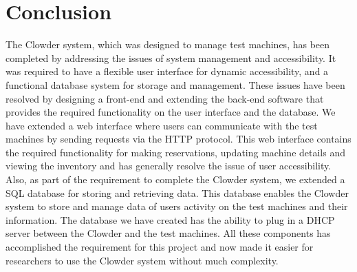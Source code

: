 \chapter{Conclusion}
\label{chap:conclusions}

The Clowder system, which was designed to manage test machines, has been completed by addressing the issues of system management and accessibility. It was required to have a flexible user interface for dynamic accessibility, and a functional database system for storage and management. These issues have been resolved by designing a front-end and extending the back-end  software that provides the required functionality on the user interface and the database. We have extended a web interface where users can communicate with the test machines by sending requests via the HTTP protocol. This web interface contains the required functionality for making reservations, updating machine details and viewing the inventory and has generally resolve the issue of user accessibility. Also, as part of the requirement to complete the Clowder system, we extended a SQL database for storing and retrieving data. This database enables the Clowder system to store and manage data of users  activity on the test machines and their information. The database we have created has the ability to plug in a DHCP server between the Clowder and the test machines. All these components has accomplished the requirement for this project and now made it easier for researchers to use the Clowder system without much complexity. 
